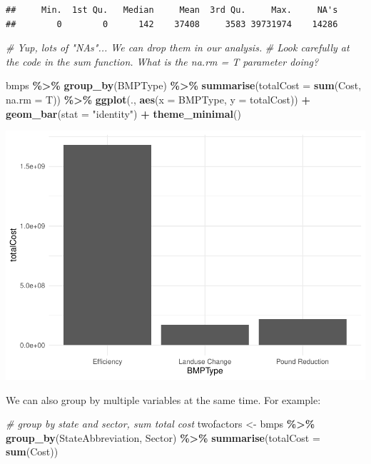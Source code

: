 \documentclass[]{article}
\newenvironment{Shaded}{\begin{snugshade}}{\end{snugshade}}
\newcommand{\AttributeTok}[1]{\textcolor[rgb]{0.13,0.29,0.53}{#1}}
\newcommand{\CommentTok}[1]{\textcolor[rgb]{0.56,0.35,0.01}{\textit{#1}}}
\newcommand{\FunctionTok}[1]{\textcolor[rgb]{0.13,0.29,0.53}{\textbf{#1}}}
\newcommand{\NormalTok}[1]{#1}
\newcommand{\OtherTok}[1]{\textcolor[rgb]{0.56,0.35,0.01}{#1}}
\newcommand{\SpecialCharTok}[1]{\textcolor[rgb]{0.81,0.36,0.00}{\textbf{#1}}}
\newcommand{\StringTok}[1]{\textcolor[rgb]{0.31,0.60,0.02}{#1}}
\begin{document}
\begin{verbatim}
##     Min.  1st Qu.   Median     Mean  3rd Qu.     Max.     NA's 
##        0        0      142    37408     3583 39731974    14286
\end{verbatim}

\begin{Shaded}
\begin{Highlighting}[]
\CommentTok{\# Yup, lots of "NA\textquotesingle{}s"... We can drop them in our analysis. }
\CommentTok{\# Look carefully at the code in the \textquotesingle{}sum\textquotesingle{} function. What is the na.rm = T parameter doing?}


\NormalTok{bmps }\SpecialCharTok{\%\textgreater{}\%} \FunctionTok{group\_by}\NormalTok{(BMPType) }\SpecialCharTok{\%\textgreater{}\%} \FunctionTok{summarise}\NormalTok{(}\AttributeTok{totalCost =} \FunctionTok{sum}\NormalTok{(Cost, }\AttributeTok{na.rm =}\NormalTok{ T)) }\SpecialCharTok{\%\textgreater{}\%}
  \FunctionTok{ggplot}\NormalTok{(., }\FunctionTok{aes}\NormalTok{(}\AttributeTok{x =}\NormalTok{ BMPType, }\AttributeTok{y =}\NormalTok{ totalCost)) }\SpecialCharTok{+}
  \FunctionTok{geom\_bar}\NormalTok{(}\AttributeTok{stat =} \StringTok{"identity"}\NormalTok{) }\SpecialCharTok{+}
  \FunctionTok{theme\_minimal}\NormalTok{()}
\end{Highlighting}
\end{Shaded}

\includegraphics{lab02_files/figure-latex/review-2.pdf}

We can also group by multiple variables at the same time. For example:

\begin{Shaded}
\begin{Highlighting}[]
\CommentTok{\# group by state and sector, sum total cost}
\NormalTok{twofactors }\OtherTok{\textless{}{-}}\NormalTok{ bmps }\SpecialCharTok{\%\textgreater{}\%} \FunctionTok{group\_by}\NormalTok{(StateAbbreviation, Sector) }\SpecialCharTok{\%\textgreater{}\%} 
  \FunctionTok{summarise}\NormalTok{(}\AttributeTok{totalCost =} \FunctionTok{sum}\NormalTok{(Cost))}
\end{Highlighting}
\end{Shaded}
\end{document}
